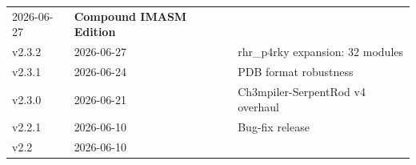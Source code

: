 \documentclass[12pt,a4paper]{article}
\begin{document}
\begin{longtable}[]{@{}lll@{}}
\begin{minipage}[t]{0.23\columnwidth}
2026-06-27\strut
\end{minipage} & \begin{minipage}[t]{0.34\columnwidth}\raggedright
\textbf{Compound IMASM Edition}\strut
\end{minipage}\tabularnewline
\begin{minipage}[t]{0.34\columnwidth}\raggedright
v2.3.2\strut
\end{minipage} & \begin{minipage}[t]{0.23\columnwidth}\raggedright
2026-06-27\strut
\end{minipage} & \begin{minipage}[t]{0.34\columnwidth}\raggedright
rhr\_p4rky expansion: 32 modules\strut
\end{minipage}\tabularnewline
\begin{minipage}[t]{0.34\columnwidth}\raggedright
v2.3.1\strut
\end{minipage} & \begin{minipage}[t]{0.23\columnwidth}\raggedright
2026-06-24\strut
\end{minipage} & \begin{minipage}[t]{0.34\columnwidth}\raggedright
PDB format robustness\strut
\end{minipage}\tabularnewline
\begin{minipage}[t]{0.34\columnwidth}\raggedright
v2.3.0\strut
\end{minipage} & \begin{minipage}[t]{0.23\columnwidth}\raggedright
2026-06-21\strut
\end{minipage} & \begin{minipage}[t]{0.34\columnwidth}\raggedright
Ch3mpiler-SerpentRod v4 overhaul\strut
\end{minipage}\tabularnewline
\begin{minipage}[t]{0.34\columnwidth}\raggedright
v2.2.1\strut
\end{minipage} & \begin{minipage}[t]{0.23\columnwidth}\raggedright
2026-06-10\strut
\end{minipage} & \begin{minipage}[t]{0.34\columnwidth}\raggedright
Bug-fix release\strut
\end{minipage}\tabularnewline
\begin{minipage}[t]{0.34\columnwidth}\raggedright
v2.2\strut
\end{minipage} & \begin{minipage}[t]{0.23\columnwidth}\raggedright
2026-06-10\strut

\end{minipage}
\end{longtable}
\end{document}
